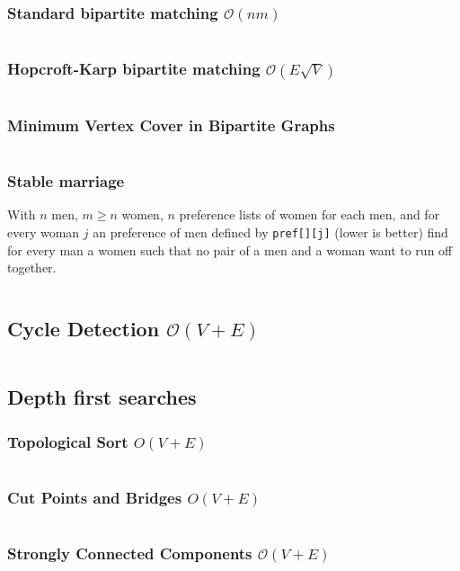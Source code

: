 \documentclass[9pt,a4paper,landscape,oneside]{amsart}
\newcommand{\mintedstyle}[2]{\inputminted{#1}{code/#2}}
\newcommand{\code}[1]{\mintedstyle{cpp}{#1}}
\begin{document}
\begin{multicols*}{3}
\begin{description}
\end{description}
\subsubsection{Standard bipartite matching $\mathcal{O}(n m)$}
\code{graphs/maxmatch.cpp}

\subsubsection{Hopcroft-Karp bipartite matching $\mathcal{O}(E \sqrt{V})$}
\code{graphs/hopcroft_karp.cpp}

\subsubsection{Minimum Vertex Cover in Bipartite Graphs}
\label{sec:mvc}
\code{graphs/bipartite_mvc.cpp}

\subsubsection{Stable marriage}
With $n$ men, $m \geq n$ women, $n$ preference lists of women for each men, and
for every woman $j$ an preference of men defined by \texttt{pref[][j]} (lower is better)
find for every man a women such that no pair of a men and a woman want to run off together.
\code{graphs/stable.cpp}

\subsection{Cycle Detection $\mathcal{O}(V + E)$}
\code{findcycle.cpp}

\subsection{Depth first searches}

\subsubsection{Topological Sort $O(V+E)$}
\code{graphs/toposort.cpp}

\subsubsection{Cut Points and Bridges $O(V+E)$}
\code{graphs/cut_points_and_bridges.cpp}

\subsubsection{Strongly Connected Components $\mathcal{O}(V + E)$}
\code{graphs/scc.cpp}


\end{multicols*}
\end{document}
